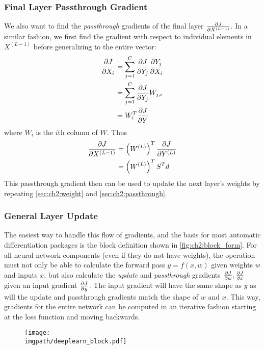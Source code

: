 \subsubsection{Final Layer Passthrough Gradient} \label{sec:ch2:passthrough}
We also want to find the \emph{passthrough} gradients of the final
layer $\frac{\partial J}{\partial X^{(L-1)}}$. In a similar fashion, we first find the gradient
with respect to individual elements in $X^{(L-1)}$ before generalizing to the
entire vector:
\begin{align}
  \frac{\partial J}{\partial X_i} &= \sum_{j=1}^{C} \frac{\partial J}{\partial Y_j} \frac{\partial Y_j}{\partial X_i} \\
                &= \sum_{j=1}^{C} \frac{\partial J}{\partial Y_j} W_{j,i} \\
                &= W_{i}^T\frac{\partial J}{\partial Y} \\
\end{align}
where $W_i$ is the $i$th column of $W$. Thus
\begin{align}
  \frac{\partial J}{\partial X^{(L-1)}} &= \left(W^{(L)}\right)^T \frac{\partial J}{\partial Y^{(L)}} \\
                      &= \left( W^{(L)} \right)^T S^T d
\end{align}
This passthrough gradient then can be used to update the next layer's weights by
repeating \autoref{sec:ch2:weight} and \autoref{sec:ch2:passthrough}.

\subsubsection{General Layer Update}
The easiest way to handle this flow of gradients, and the basis for most
automatic differentiation packages is the block definition shown in
\autoref{fig:ch2:block_form}. For all neural network components (even if they do
not have weights), the operation must not only be able to calculate the forward
pass $y=f(x, w)$ given weights $w$ and inputs $x$, but also calculate the
\emph{update} and \emph{passthrough} gradients $\frac{\partial J}{\partial w}, \frac{\partial J}{\partial x}$ given
an input gradient $\frac{\partial J}{\partial y}$. The input gradient will have the same shape as
$y$ as will the update and passthrough gradients match the shape of $w$ and $x$.
This way, gradients for the entire network can be computed in an iterative
fashion starting at the loss function and moving backwards.

\begin{figure}
  \centering
  \texttt{[image: \\imgpath/deeplearn\_block.pdf]}
  \label{fig:ch2:block_form}
\end{figure}

